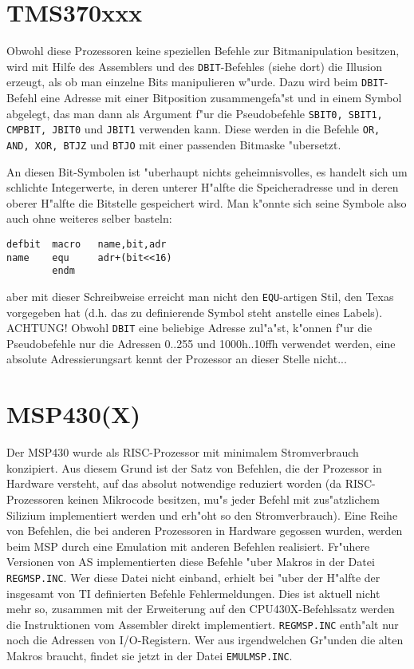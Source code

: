 \documentclass[12pt,a4paper,twoside]{report}
\newcommand{\tty}[1]{{\tt #1}}
\begin{document}
{%

\section{TMS370xxx}

Obwohl diese Prozessoren keine speziellen Befehle zur Bitmanipulation
besitzen, wird mit Hilfe des Assemblers und des \tty{DBIT}-Befehles
(siehe dort) die Illusion erzeugt, als ob man einzelne Bits manipulieren
w"urde.  Dazu wird beim \tty{DBIT}-Befehl eine Adresse mit einer
Bitposition zusammengefa"st und in einem Symbol abgelegt, das man dann
als Argument f"ur die Pseudobefehle \tty{SBIT0, SBIT1, CMPBIT, JBIT0}
und \tty{JBIT1} verwenden kann.  Diese werden in die Befehle
\tty{OR, AND, XOR, BTJZ} und \tty{BTJO} mit einer passenden Bitmaske
"ubersetzt.
\par
An diesen Bit-Symbolen ist "uberhaupt nichts geheimnisvolles, es handelt
sich um schlichte Integerwerte, in deren unterer H"alfte die
Speicheradresse und in deren oberer H"alfte die Bitstelle gespeichert
wird.  Man k"onnte sich seine Symbole also auch ohne weiteres selber
basteln:
\begin{verbatim}
defbit  macro   name,bit,adr
name    equ     adr+(bit<<16)
        endm
\end{verbatim}
aber mit dieser Schreibweise erreicht man nicht den \tty{EQU}-artigen Stil,
den Texas vorgegeben hat (d.h. das zu definierende Symbol steht anstelle
eines Labels).  ACHTUNG!  Obwohl \tty{DBIT} eine beliebige Adresse
zul"a"st, k"onnen f"ur die Pseudobefehle nur die Adressen 0..255 und
1000h..10ffh verwendet werden, eine absolute Adressierungsart kennt
der Prozessor an dieser Stelle nicht...


\section{MSP430(X)}
\label{MSPSpec}

Der MSP430 wurde als RISC-Prozessor mit minimalem Stromverbrauch 
konzipiert.  Aus diesem Grund ist der Satz von Befehlen, die der
Prozessor in Hardware versteht, auf das absolut notwendige reduziert 
worden (da RISC-Prozessoren keinen Mikrocode besitzen, mu"s jeder 
Befehl mit zus"atzlichem Silizium implementiert werden und erh"oht so
den Stromverbrauch).  Eine Reihe von Befehlen, die bei anderen 
Prozessoren in Hardware gegossen wurden, werden beim MSP durch eine 
Emulation mit anderen Befehlen realisiert.  Fr"uhere Versionen
von AS implementierten diese Befehle "uber Makros in der Datei
\tty{REGMSP.INC}.  Wer diese Datei nicht einband, erhielt bei "uber
der H"alfte der insgesamt von TI definierten Befehle
Fehlermeldungen.  Dies ist aktuell nicht mehr so, zusammen mit
der Erweiterung auf den CPU430X-Befehlssatz werden die
Instruktionen vom Assembler direkt implementiert. 
\tty{REGMSP.INC} enth"alt nur noch die Adressen von I/O-Registern. 
Wer aus irgendwelchen Gr"unden die alten Makros braucht, findet
sie jetzt in der Datei \tty{EMULMSP.INC}.

}
\end{document}

